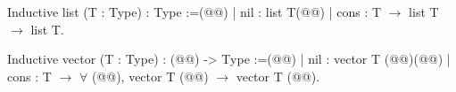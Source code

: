 Inductive list (T : Type) : Type :=(@\vspace{-0.04cm}@)
| nil : list T(@\vspace{-0.04cm}@)
| cons : T $\rightarrow$ list T $\rightarrow$ list T.

Inductive vector (T : Type) : (@@) -> Type :=(@\vspace{-0.04cm}@)
| nil : vector T (@@)(@\vspace{-0.04cm}@)
| cons : T $\rightarrow$ $\forall$ (@@), vector T (@@) $\rightarrow$ vector T (@@).
